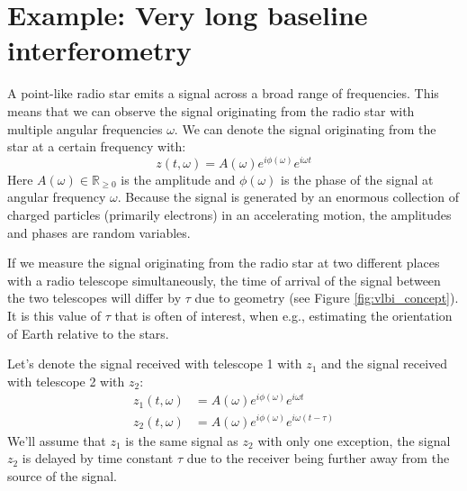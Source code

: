 \section{Example: Very long baseline interferometry}
A point-like radio star emits a signal across a broad range of frequencies. This means that we can observe the signal originating from the radio star with multiple angular frequencies $\omega$. We can denote the signal originating from the star at a certain frequency with:
\begin{equation}
z(t,\omega) = A(\omega) e^{i\phi(\omega)} e^{i\omega t}
\end{equation}
Here $A(\omega) \in \mathbb{R}_{\ge 0}$ is the amplitude and $\phi(\omega)$ is the phase of the signal at angular frequency $\omega$. Because the signal is generated by an enormous collection of charged particles (primarily electrons) in an accelerating motion, the amplitudes and phases are random variables.

If we measure the signal originating from the radio star at two different places with a radio telescope simultaneously, the time of arrival of the signal between the two telescopes will differ by $\tau$ due to geometry (see Figure \ref{fig:vlbi_concept}). It is this value of $\tau$ that is often of interest, when e.g., estimating the orientation of Earth relative to the stars. 

Let's denote the signal received with telescope 1 with $z_1$ and the signal received with telescope 2 with $z_2$:
\begin{align}
z_1(t,\omega) &= A(\omega) e^{i\phi(\omega)} e^{i\omega t} \\
z_2(t,\omega) &= A(\omega) e^{i\phi(\omega)} e^{i\omega (t-\tau)}
\end{align}
We'll assume that $z_1$ is the same signal as $z_2$ with only one exception, the signal $z_2$ is delayed by time constant $\tau$ due to the receiver being further away from the source of the signal.

